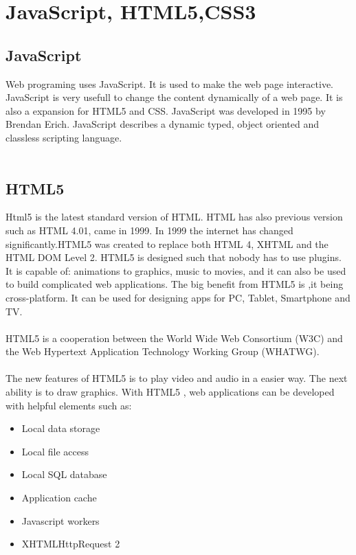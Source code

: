 \section{JavaScript, HTML5,CSS3}
 \subsection{JavaScript}
 Web programing uses JavaScript. It is used to make the web page interactive. JavaScript is very usefull to change the content dynamically of a web page. It is also a expansion for HTML5 and CSS. JavaScript was developed in 1995 by Brendan Erich. JavaScript describes a dynamic typed, object oriented and classless scripting language.\cite{javascript}
 \\\\
 \subsection{HTML5}
 Html5 is the latest standard version of HTML. HTML has also previous version such as HTML 4.01, came in 1999. In 1999 the internet has changed significantly.HTML5 was created to replace  both HTML 4, XHTML and the HTML DOM Level 2. HTML5 is designed such that nobody has to use plugins. It is capable of: animations to graphics, music to movies, and it can also be used to build complicated web applications. The big benefit from HTML5 is ,it being cross-platform. It can be used for designing apps for PC, Tablet, Smartphone and TV.\\\\
 HTML5 is a cooperation between the World Wide Web Consortium (W3C) and the Web Hypertext Application Technology Working Group (WHATWG).\\\\
 
  The new features of HTML5 is to play video and audio in a easier way. The next ability is to draw graphics. With HTML5 , web applications can be developed with helpful elements such as:\\
  \begin{itemize}
  \item Local data storage
  \item Local file access
  \item Local SQL database
  \item Application cache
  \item Javascript workers
  \item XHTMLHttpRequest 2
  
  \end{itemize}
  
